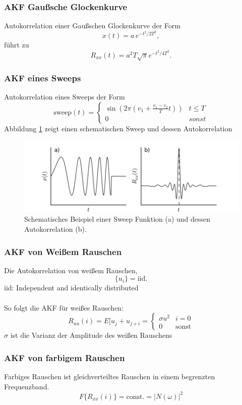 \subsubsection*{AKF Gaußsche Glockenkurve}
Autokorrelation einer Gaußschen Glockenkurve der Form
\[
x(t) = a\,e^{-t^2/2T^2},
\]
führt zu
\[
R_{xx}(t) = a^2 T \sqrt{\pi} e^{-t^2/4T^2}.
\]

\subsubsection*{AKF eines Sweeps}
Autokorrelation eines Sweeps der Form
\[
\mbox{sweep}(t)=
\begin{cases}
\sin \left(2\pi \left(v_1 + \frac{v_1-v_2}{T} t \right)\right) & t \leq T\\
0& sonst
\end{cases}
\]
Abbildung \ref{fig:korr_sweep} zeigt einen schematischen Sweep und dessen Autokorrelation

\begin{figure}[h!]
\centering
\includegraphics[width=.9\tw]{fig/07-Korrelation/04-example_sweep.png}
\caption{Schematisches Beispiel einer Sweep Funktion (a) und dessen Autokorrelation (b).}
\label{fig:korr_sweep}
\end{figure}

\subsubsection*{AKF von Weißem Rauschen}
Die Autokorrelation von weißem Rauschen,
\[
\{u_i\} = \mbox{iid}.
\]
{\small iid: Independent and identically distributed}\\\\
So folgt die AKF für weißes Rauschen:
\[
R_{uu}(i) = E[u_j + u_{j+i} =
\begin{cases}
\sigma u^2 & i=0\\
0 & \mbox{sonst}
\end{cases}
\]
{\small $\sigma$ ist die Varianz der Amplitude des weißen Rauschens}

\subsubsection*{AKF von farbigem Rauschen}
Farbiges Rauschen ist gleichverteiltes Rauschen in einem begrenzten Frequenzband.
\[
F\{R_{xx}(i)\} = \mbox{const.} = |N(\omega)|^2
\]

